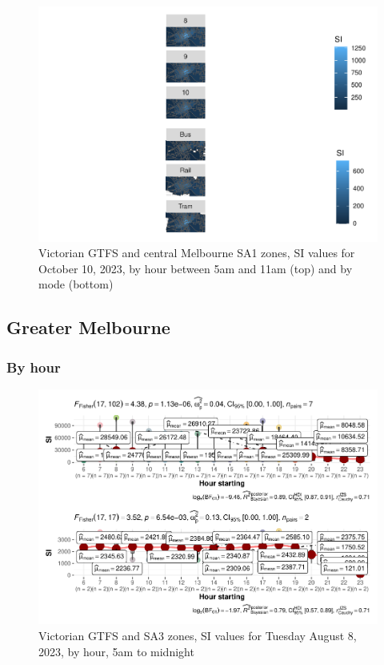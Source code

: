 \documentclass[preprint, 3p,
authoryear]{elsarticle} %
\begin{document}
\begin{figure}
\centering
\includegraphics{Leveraging_GTFS_to_assess_transit_supply_Transport_Geography_files/figure-latex/Melbourne_CBD_map_230808-1.pdf}
\caption{Victorian GTFS and central Melbourne SA1 zones, SI values for
October 10, 2023, by hour between 5am and 11am (top) and by mode
(bottom)}
\end{figure}

\hypertarget{greater-melbourne}{%
\subsection{Greater Melbourne}\label{greater-melbourne}}

\hypertarget{by-hour}{%
\subsubsection{By hour}\label{by-hour}}

\begin{figure}
\centering
\includegraphics{Leveraging_GTFS_to_assess_transit_supply_Transport_Geography_files/figure-latex/Melbourne_230808_by_hour-1.pdf}
\caption{Victorian GTFS and SA3 zones, SI values for Tuesday August 8,
2023, by hour, 5am to midnight}
\end{figure}
\end{document}

